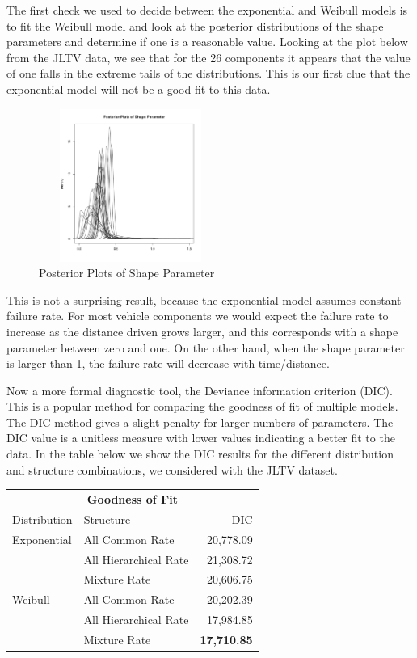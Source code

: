 \documentclass[12pt]{article}
\begin{document}
The first check we used to decide between the exponential and Weibull models is
to fit the Weibull model and look at the posterior distributions of the
shape parameters and determine if one is a reasonable value.  Looking at the
plot below from the JLTV data, we see that for the 26 components it appears
that the value of one falls in the extreme tails of the distributions.  This is
our first clue that the exponential model will not be a good fit to this data.

\begin{figure}
  \centering
      \includegraphics[width=6cm, height=5cm]{betaPostPlot}
  \caption{Posterior Plots of Shape Parameter}
\end{figure}

This is not a surprising result, because the exponential model assumes constant
failure rate.  For most vehicle components we would expect the failure rate to
increase as the distance driven grows larger, and this corresponds with a shape
parameter between zero and one.  On the other hand, when the shape parameter is
larger than 1, the failure rate will decrease with time/distance.

Now a more formal diagnostic tool, the Deviance information criterion (DIC).
This is a popular method for comparing the goodness of fit of multiple models.
The DIC method gives a slight penalty for larger numbers of parameters.  The DIC
value is a unitless measure with lower values indicating a better fit to the
data.  In the table below we show the DIC results for the different distribution
and structure combinations, we considered with the JLTV dataset.

\begin{tabular}{|l|l|r|}
\multicolumn{3}{c}{\textbf{Goodness of Fit}} \\
\cline{1-3}
Distribution    & Structure & DIC \\
\hline
Exponential   & All Common Rate                      & 20,778.09             \\
              & All Hierarchical Rate                & 21,308.72             \\
              & Mixture Rate                         & 20,606.75             \\
Weibull       & All Common Rate                      & 20,202.39             \\
              & All Hierarchical Rate                & 17,984.85             \\
              & Mixture Rate                         & \textbf{17,710.85}    \\
\hline
\end{tabular}
\end{document}
